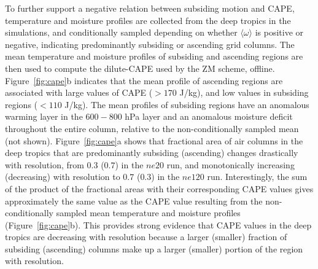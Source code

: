 To further support a negative relation between subsiding motion and CAPE, temperature and moisture profiles are collected from the deep tropics in the simulations, and conditionally sampled depending on whether $\langle \omega \rangle$ is positive or negative, indicating predominantly subsiding or ascending grid columns. The mean temperature and moisture profiles of subsiding and ascending regions are then used to compute the dilute-CAPE used by the ZM scheme, offline. Figure~\ref{fig:cape}b indicates that the mean profile of ascending regions are associated with large values of CAPE ($>170$ J/kg), and low values in subsiding regions ($<110$ J/kg). The mean profiles of subsiding regions have an anomalous warming layer in the $600-800$ hPa layer and an anomalous moisture deficit throughout the entire column, relative to the non-conditionally sampled mean (not shown). Figure~\ref{fig:cape}a shows that fractional area of air columns in the deep tropics that are predominantly subsiding (ascending) changes drastically with resolution, from $0.3$ ($0.7$) in the $ne20$ run, and monotonically increasing (decreasing) with resolution to $0.7$ ($0.3$) in the $ne120$ run. Interestingly, the sum of the product of the fractional areas with their corresponding CAPE values gives approximately the same value as the CAPE value resulting from the non-conditionally sampled mean temperature and moisture profiles (Figure~\ref{fig:cape}b). This provides strong evidence that CAPE values in the deep tropics are decreasing with resolution because a larger (smaller) fraction of subsiding (ascending) columns make up a larger (smaller) portion of the region with resolution.

